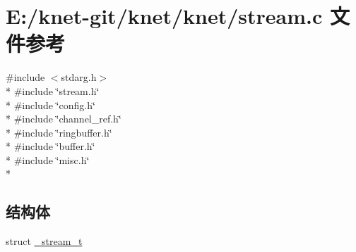 \hypertarget{a00090}{}\section{E\+:/knet-\/git/knet/knet/stream.c 文件参考}
\label{a00090}
{\ttfamily \#include $<$stdarg.\+h$>$}\\*
{\ttfamily \#include \char`\"{}stream.\+h\char`\"{}}\\*
{\ttfamily \#include \char`\"{}config.\+h\char`\"{}}\\*
{\ttfamily \#include \char`\"{}channel\+\_\+ref.\+h\char`\"{}}\\*
{\ttfamily \#include \char`\"{}ringbuffer.\+h\char`\"{}}\\*
{\ttfamily \#include \char`\"{}buffer.\+h\char`\"{}}\\*
{\ttfamily \#include \char`\"{}misc.\+h\char`\"{}}\\*
\subsection*{结构体}
\begin{DoxyCompactItemize}
\item 
struct \hyperlink{a00034}{\+\_\+stream\+\_\+t}
\end{DoxyCompactItemize}

